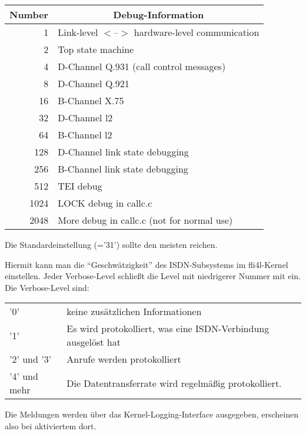 \begin{description}
  \begin{tabular}[h!]{r|l}
   \multicolumn{1}{c|}{\textbf{Number}} & \multicolumn{1}{c}{\textbf{Debug-Information}} \\
   \hline
      1 & Link-level $<$--$>$ hardware-level communication \\
      2 & Top state machine \\
      4 & D-Channel Q.931 (call control messages) \\
      8 & D-Channel Q.921 \\
     16 & B-Channel X.75 \\
     32 & D-Channel l2 \\
     64 & B-Channel l2 \\
    128 & D-Channel link state debugging \\
    256 & B-Channel link state debugging \\
    512 & TEI debug \\
   1024 & LOCK debug in callc.c \\
   2048 & More debug in callc.c (not for normal use) \\
  \end{tabular}\latex{\\}

  Die Standardeinstellung (='31') sollte den meisten reichen.
  
  
  Hiermit kann man die ``Geschwätzigkeit'' des ISDN-Subsystems im
  fli4l-Kernel einstellen. Jeder Verbose-Level schließt die Level mit
  niedrigerer Nummer mit ein. Die Verbose-Level sind:

  \begin{tabular}[h!]{lp{10cm}}
    '0' & keine zusätzlichen Informationen \\
    '1' & Es wird protokolliert, was eine ISDN-Verbindung ausgelöst hat\\
    '2' und '3' & Anrufe werden protokolliert\\
    '4' und mehr & Die Datentransferrate wird regelmäßig protokolliert. \\
  \end{tabular}

  Die Meldungen werden über das Kernel-Logging-Interface ausgegeben, erscheinen
  also bei aktiviertem  dort.


\end{description}
